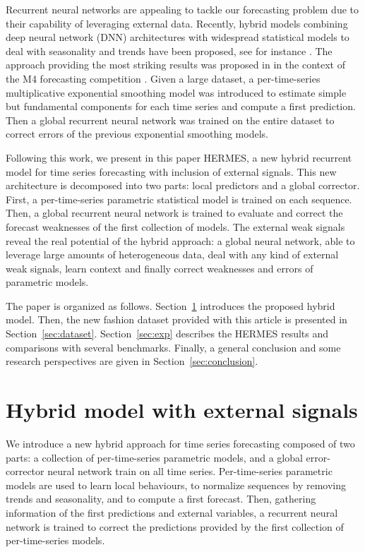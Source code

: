\documentclass[review]{elsarticle}
\begin{document}
Recurrent neural networks are appealing to tackle our forecasting problem due to their capability of leveraging external data.  Recently, hybrid models combining deep neural network (DNN) architectures with widespread statistical models to deal with seasonality and trends have been proposed, see for instance  \cite{zhang2003time,jianwei2019novel,bandara2020lstm}. The approach providing the most striking results was proposed in  \cite{smyl2020hybrid} in the context of the M4 forecasting competition \cite{makridakis2020m4}.  Given a large dataset, a per-time-series multiplicative exponential smoothing model was introduced to estimate simple but fundamental components for each time series and compute a first prediction. Then a global recurrent neural network was trained on the entire dataset to correct errors of the previous exponential smoothing models. 

Following this work, we present in this paper HERMES, a new hybrid recurrent model for time series forecasting with inclusion of external signals. This new architecture is decomposed  into two parts: local predictors and a global corrector.  First, a per-time-series parametric statistical model is trained on each sequence. Then, a global recurrent neural network is trained to evaluate and correct the forecast weaknesses of the first collection of models. The external weak signals reveal the real potential of the hybrid approach: a global neural network, able to leverage large amounts of heterogeneous data, deal with any kind of external weak signals, learn context and finally correct weaknesses and errors of parametric models.

The paper is organized as follows. Section~\ref{sec:hybrid} introduces the proposed hybrid model. Then, the new fashion dataset provided with this article is presented in Section~\ref{sec:dataset}. Section~\ref{sec:exp} describes the HERMES results and comparisons with several benchmarks. Finally, a general conclusion and some research perspectives are given in  Section~\ref{sec:conclusion}.

\section{Hybrid model with external signals}
\label{sec:hybrid}
We introduce a new hybrid approach for time series forecasting  composed of two parts: a collection of per-time-series parametric models, and a global error-corrector neural network train on all time series. Per-time-series parametric models are used to learn local behaviours, to normalize sequences by removing trends and seasonality,  and to compute a first forecast. Then, gathering information of the first predictions and external variables, a recurrent neural network is trained to correct the predictions provided by the first collection of per-time-series models.
\end{document}
